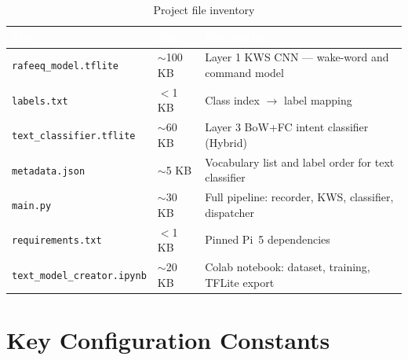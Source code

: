 \documentclass[12pt, a4paper]{report}
\newcommand{\thead}[1]{%
  \cellcolor{tableheader}\textcolor{white}{\textbf{#1}}}
\newcommand{\trow}[1]{\rowcolor{rowalt}#1}
\begin{document}
\begin{table}[h!]
\centering
\caption{Project file inventory}
\label{tab:files}
\begin{tabularx}{\textwidth}{llX}
\toprule
\thead{File} & \thead{Size} & \thead{Description} \\
\midrule
\trow{\texttt{rafeeq\_model.tflite}}       & $\sim$100 KB & Layer 1 KWS CNN --- wake-word and command model \\
\texttt{labels.txt}                         & $<$1 KB      & Class index $\rightarrow$ label mapping \\
\trow{\texttt{text\_classifier.tflite}}    & $\sim$60 KB  & Layer 3 BoW+FC intent classifier (Hybrid) \\
\texttt{metadata.json}                      & $\sim$5 KB   & Vocabulary list and label order for text classifier \\
\trow{\texttt{main.py}}                    & $\sim$30 KB  & Full pipeline: recorder, KWS, classifier, dispatcher \\
\texttt{requirements.txt}                   & $<$1 KB      & Pinned Pi~5 dependencies \\
\trow{\texttt{text\_model\_creator.ipynb}} & $\sim$20 KB  & Colab notebook: dataset, training, TFLite export \\
\bottomrule
\end{tabularx}
\end{table}

\section{Key Configuration Constants}
\end{document}
